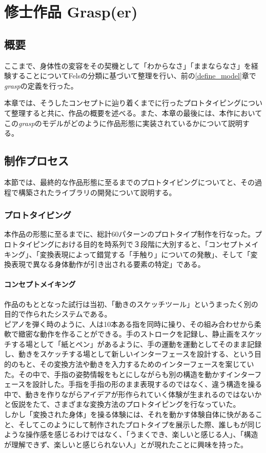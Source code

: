 \chapter{修士作品 Grasp(er)}
\section{概要}
ここまで、身体性の変容をその契機として「わからなさ」「ままならなさ」を経験することについてFelsの分類に基づいて整理を行い、前の\ref{define_model}章で\textit{grasp}の定義を行った。

本章では、そうしたコンセプトに辿り着くまでに行ったプロトタイピングについて整理すると共に、作品の概要を述べる。また、本章の最後には、本作においてこの\textit{grasp}のモデルがどのように作品形態に実装されているかについて説明する。

\section{制作プロセス}
本節では、最終的な作品形態に至るまでのプロトタイピングについてと、その過程で構築されたライブラリの開発について説明する。
\subsection{プロトタイピング}
本作品の形態に至るまでに、総計60パターンのプロトタイプ制作を行なった。プロトタイピングにおける目的を時系列で３段階に大別すると、「コンセプトメイキング」、「変換表現によって錯覚する「手触り」についての発散」、そして「変換表現で異なる身体動作が引き出される要素の特定」である。
\subsubsection{コンセプトメイキング}
作品のもととなった試行は当初、「動きのスケッチツール」というまったく別の目的で作られたシステムである。\\
ピアノを弾く時のように、人は10本ある指を同時に操り、その組み合わせから柔軟で緻密な動作を作ることができる。手のストロークを記録し、静止画をスケッチする場として「紙とペン」があるように、手の運動を運動としてそのまま記録し、動きをスケッチする場として新しいインターフェースを設計する、という目的のもと、その変換方法や動きを入力するためのインターフェースを案じていた。その中で、手指の姿勢情報をもとにしながらも別の構造を動かすインターフェースを設計した。手指を手指の形のまま表現するのではなく、違う構造を操る中で、動きを作りながらアイデアが形作られていく体験が生まれるのではないかと仮説をたて、さまざまな変換方法のプロトタイピングを行なっていた。\\
しかし「変換された身体」を操る体験には、それを動かす体験自体に快があること、そしてこのようにして制作されたプロトタイプを展示した際、誰しもが同じような操作感を感じるわけではなく、「うまくでき、楽しいと感じる人」、「構造が理解できず、楽しいと感じられない人」とが現れたことに興味を持った。\\

